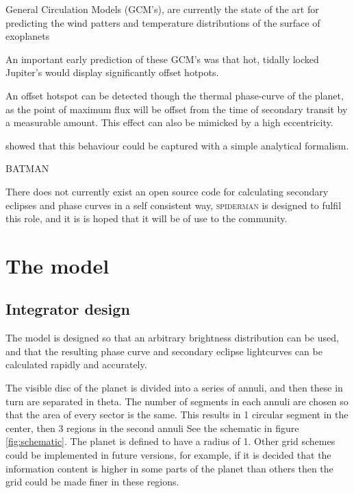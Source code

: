 \documentclass[a4paper,fleqn,usenatbib]{mnras}
\begin{document}
\citep[e.g.][]{Showman2015}

General Circulation Models (GCM's), are currently the state of the art for predicting the wind patters and temperature distributions of the surface of exoplanets \citep[e.g.][]{Showman2008}

An important early prediction of these GCM's was that hot, tidally locked Jupiter's would display significantly offset hotpots.

An offset hotspot can be detected though the thermal phase-curve of the planet, as the point of maximum flux will be offset from the time of secondary transit by a measurable amount. This effect can also be mimicked by a high eccentricity. 

\citet{Zhang2016} showed that this behaviour could be captured with a simple analytical formalism.

BATMAN \citep{Kreidberg2015a}

There does not currently exist an open source code for calculating secondary eclipses and phase curves in a self consistent way, \textsc{spiderman} is designed to fulfil this role, and it is is hoped that it will be of use to the community.

\section{The model}\label{sec:the model}

\subsection{Integrator design}\label{sec:integrator}

The model is designed so that an arbitrary brightness distribution can be used, and that the resulting phase curve and secondary eclipse lightcurves can be calculated rapidly and accurately. 

The visible disc of the planet is divided into a series of annuli, and then these in turn are separated in theta. The number of segments in each annuli are chosen so that the area of every sector is the same. This results in 1 circular segment in the center, then 3 regions in the second annuli See the schematic in figure \ref{fig:schematic}. The planet is defined to have a radius of 1. Other grid schemes could be implemented in future versions, for example, if it is decided that the information content is higher in some parts of the planet than others then the grid could be made finer in these regions.
\end{document}
